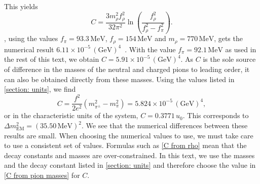This yields
%
\begin{equation}
    \label{C from rho}
    C = \frac{3 m_\rho^2 f_\rho^2}{32 \pi^2} 
    \ln\left(  \frac{f_\rho^2}{f_\rho^2 - f_\pi^2}  \right).
\end{equation}
%
\citeauthor{urechVirtualPhotonsChiral1995}, using the values $f_\pi = 93.3\, \text{MeV}$, $f_\rho = 154\,\text{MeV}$ and $m_\rho = 770\, \text{MeV}$, gets the numerical result $6.11\times 10^{-5} \, (\text{GeV})^4$~\autocite{urechVirtualPhotonsChiral1995}.
With the value $f_\pi = 92.1\,\text{MeV}$ as used in the rest of this text, we obtain $C = 5.91\times 10^{-5} \, (\text{GeV})^4$.
As $C$ is the sole source of difference in the masses of the neutral and charged pions to leading order, it can also be obtained directly from these masses.
Using the values listed in \autoref{section: units}, we find
%
\begin{equation}
    \label{C from pion masses}
    C= \frac{f^2}{2 e^2}(m_{\pi^\pm}^2 - m_{\pi}^2) = 5.824 \times 10^{-5} \, (\text{GeV})^4 ,
\end{equation}
%
or in the characteristic units of the system, $C = 0.3771 \, u_0$.
This corresponds to $\Delta m_\text{EM}^2 = (35.50 \, \text{MeV})^2$.
We see that the numerical differences between these results are small.
When choosing the numerical values to use, we must take care to use a consistent set of values.
Formulas such as \autoref{C from rho} mean that the decay constants and masses are over-constrained.
In this text, we use the masses and the decay constant listed in \autoref{section: units} and therefore choose the value in \autoref{C from pion masses} for $C$.

